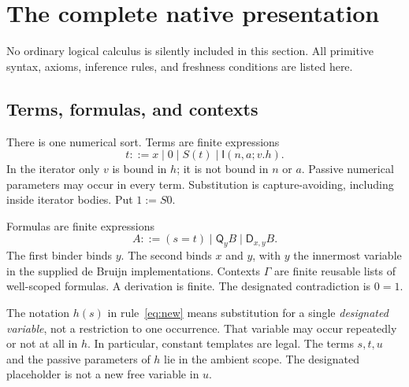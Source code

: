 \documentclass[11pt,letterpaper]{article}
\theoremstyle{definition}\newtheorem{definition}[theorem]{Definition}
\theoremstyle{remark}\newtheorem{remark}[theorem]{Remark}
\newcommand{\Q}{\mathsf Q}
\newcommand{\D}{\mathsf D}
\newcommand{\I}{\mathsf I}
\begin{document}
\section{The complete native presentation}
\label{sec:presentation}
No ordinary logical calculus is silently included in this section. All
primitive syntax, axioms, inference rules, and freshness conditions are
listed here.

\subsection{Terms, formulas, and contexts}
There is one numerical sort. Terms are finite expressions
\[
 t ::= x\mid 0\mid S(t)\mid \I(n,a;v.h).
 \tag{3}
\]
In the iterator only \(v\) is bound in \(h\); it is not bound in \(n\) or
\(a\). Passive numerical parameters may occur in every term. Substitution
is capture-avoiding, including inside iterator bodies. Put \(1:=S0\).

Formulas are finite expressions
\[
 A ::= (s=t)\mid \Q_y B\mid \D_{x,y}B.
 \tag{4}
\]
The first binder binds \(y\). The second binds \(x\) and \(y\), with
\(y\) the innermost variable in the supplied de Bruijn implementations.
Contexts \(\Gamma\) are finite reusable lists of well-scoped formulas.
A derivation is finite. The designated contradiction is \(0=1\).

The notation \(h(s)\) in rule~\eqref{eq:new} means substitution for a
single \emph{designated variable}, not a restriction to one occurrence.
That variable may occur repeatedly or not at all in \(h\). In particular,
constant templates are legal. The terms \(s,t,u\) and the passive
parameters of \(h\) lie in the ambient scope. The designated placeholder
is not a new free variable in \(u\).
\end{document}
